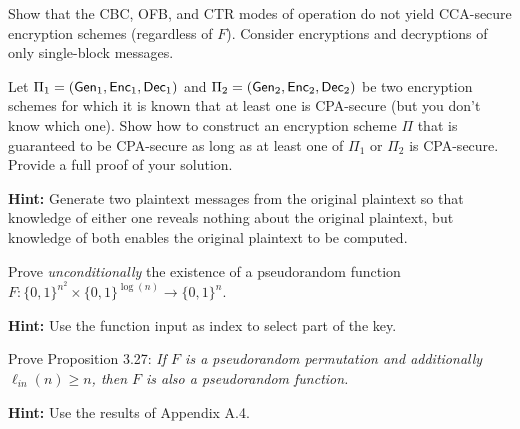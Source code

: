 \documentclass[a4paper,10pt,landscape,twocolumn]{scrartcl}
\begin{document}
\begin{exercise}
Show that the CBC, OFB, and CTR modes of operation do not yield CCA-secure encryption schemes (regardless of $F$). Consider encryptions and decryptions of only single-block messages.
\end{exercise}

\begin{exercise}
  Let $\Pi_1 = (\mathsf{Gen}_1,\mathsf{Enc}_1, \mathsf{Dec}_1)$ and $\Pi_2 = (\mathsf{Gen}_2,\mathsf{Enc}_2, \mathsf{Dec}_2)$ be two encryption schemes for which it is known that at least one is CPA-secure (but you don't know which one). Show how to construct an encryption scheme $\Pi$ that is guaranteed to be CPA-secure as long as at least one of $\Pi_1$ or $\Pi_2$ is CPA-secure. Provide a full proof of your solution.

  \textbf{Hint:} Generate two plaintext messages from the original plaintext so that knowledge of either one reveals nothing about the original plaintext, but knowledge of both enables the original plaintext to be computed.
\end{exercise}





\begin{bonusexercise}
  Prove \emph{unconditionally} the existence of a pseudorandom function $F : \{0,1\}^{n^2} \times \{0,1\}^{\log(n)} \to \{0,1\}^n$.

  \textbf{Hint:} Use the function input as index to select part of the key.
\end{bonusexercise}

\begin{bonusexercise}
  Prove Proposition 3.27:
  \textit{
If $F$ is a pseudorandom permutation and additionally $\ell_{in}(n) \geq n$, then $F$ is also a pseudorandom function.
  }

\textbf{Hint:} Use the results of Appendix A.4.
\end{bonusexercise}
\end{document}
